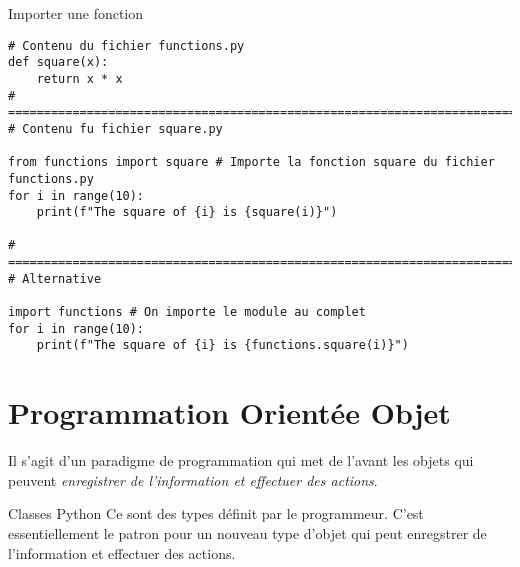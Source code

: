 \documentclass{report}
\begin{document}
\begin{EExample*}{Importer une fonction}{}
\begin{lstlisting}[style=PythonDraculaWhite]
# Contenu du fichier functions.py
def square(x):
    return x * x
# ===============================================================================
# Contenu fu fichier square.py

from functions import square # Importe la fonction square du fichier functions.py
for i in range(10):
    print(f"The square of {i} is {square(i)}")

# ===============================================================================
# Alternative

import functions # On importe le module au complet 
for i in range(10):
    print(f"The square of {i} is {functions.square(i)}")
\end{lstlisting}
\end{EExample*}

\section{Programmation Orientée Objet}
\begin{DefG*}{}{}
Il s'agit d'un paradigme de programmation qui met de l'avant les objets qui peuvent 
\textit{enregistrer de l'information et effectuer des actions}.
\end{DefG*}
\begin{DefG*}{Classes Python}{}
Ce sont des types définit par le programmeur. C'est essentiellement le patron pour un nouveau
type d'objet qui peut enregstrer de l'information et effectuer des actions. 
\end{DefG*}
\end{document}

